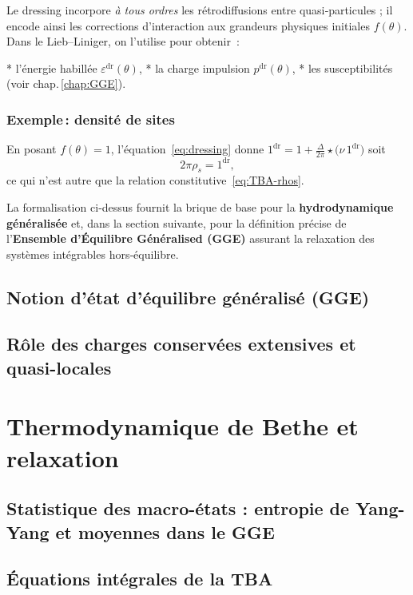 Le dressing incorpore \emph{à tous ordres} les rétrodiffusions entre
quasi‑particules ; il encode ainsi les corrections
d’interaction aux grandeurs physiques initiales $f(\theta)$.
Dans le Lieb–Liniger, on l’utilise pour obtenir :

* l’énergie habillée $\varepsilon^{\mathrm{dr}}(\theta)$,
* la charge impulsion $p^{\mathrm{dr}}(\theta)$,
* les susceptibilités (voir chap.\,\ref{chap:GGE}).

\subsubsection{Exemple\,: densité de sites}

En posant $f(\theta)=1$, l’équation~\eqref{eq:dressing} donne
\(
1^{\mathrm{dr}}=1+\frac{\Delta}{2\pi}\star\bigl(\nu\,1^{\mathrm{dr}}\bigr)
\) soit 
\[
2\pi\rho_s=1^{\mathrm{dr}},
\]
ce qui n’est autre que la
relation constitutive~\eqref{eq:TBA-rhos}.

\vspace{1ex}
La formalisation ci‑dessus fournit la brique de base pour la
\textbf{hydrodynamique généralisée} et, dans la section suivante, pour la
définition précise de l’\textbf{Ensemble d’Équilibre Généralised (GGE)}
assurant la relaxation des systèmes intégrables hors‑équilibre.





%
\subsection{Notion d’état d’équilibre généralisé (GGE)}

\subsection{Rôle des charges conservées extensives et quasi-locales}


\section{Thermodynamique de Bethe et relaxation}
\subsection{Statistique des macro-états : entropie de Yang-Yang et moyennes dans le GGE}

\subsection{Équations intégrales de la TBA}



